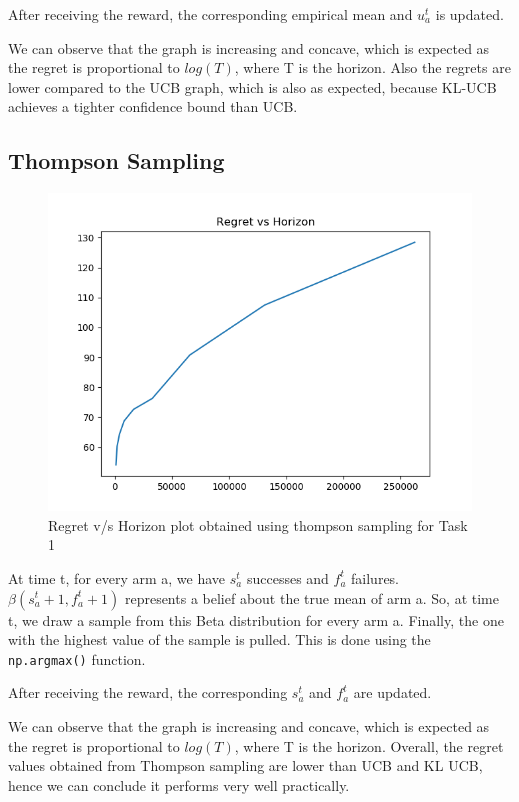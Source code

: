 \documentclass{article}
\begin{document}
After receiving the reward, the corresponding empirical mean and $u_{a}^{t}$ is updated.

We can observe that the graph is increasing and concave, which is expected as the 
regret is proportional to $log(T)$, where T is the horizon.
Also the regrets are lower compared to the UCB graph, which is also as expected, because
KL-UCB achieves a tighter confidence bound than UCB.

\newpage
\thispagestyle{fancy}
\subsection{Thompson Sampling}
\begin{figure}[H]
    \centerline{\includegraphics[scale=0.75]{task1-Thompson_Sampling-20220831-120225.png}}
    \caption{Regret v/s Horizon plot obtained using thompson sampling for Task 1}
\end{figure}


At time t, for every arm a, we have $s_{a}^{t}$ successes and $f_{a}^{t}$ failures. 
$\beta(s_{a}^{t}+1,f_{a}^{t}+1)$ represents a belief about the true mean of arm a.
So, at time t, we draw a sample from this Beta distribution for every arm a. Finally,
the one with the highest value of the sample is pulled. This is done using the \verb!np.argmax()! function.

After receiving the reward, the corresponding $s_{a}^{t}$ and $f_{a}^{t}$ are updated.

We can observe that the graph is increasing and concave, which is expected as the 
regret is proportional to $log(T)$, where T is the horizon. Overall, the regret values 
obtained from Thompson sampling are lower than UCB and KL UCB, hence we can conclude it 
performs very well practically.
\end{document}
